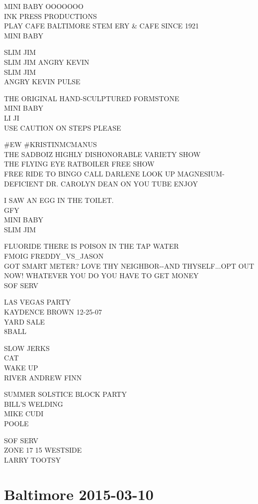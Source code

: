 \documentclass[10pt,letterpaper]{article}
\begin{document}
MINI BABY OOOOOOO\\
INK PRESS PRODUCTIONS\\
PLAY CAFE BALTIMORE STEM ERY \& CAFE SINCE 1921\\
MINI BABY

SLIM JIM\\
SLIM JIM ANGRY KEVIN\\
SLIM JIM\\
ANGRY KEVIN PULSE

THE ORIGINAL HAND{-}SCULPTURED FORMSTONE\\
MINI BABY\\
LI JI\\
USE CAUTION ON STEPS PLEASE

\#EW \#KRISTINMCMANUS\\
THE SADBOIZ HIGHLY DISHONORABLE VARIETY SHOW\\
THE FLYING EYE RATBOILER FREE SHOW\\
FREE RIDE TO BINGO CALL DARLENE LOOK UP MAGNESIUM{-}DEFICIENT DR. CAROLYN DEAN ON YOU TUBE ENJOY

I SAW AN EGG IN THE TOILET.\\
GFY\\
MINI BABY\\
SLIM JIM

FLUORIDE THERE IS POISON IN THE TAP WATER\\
FMOIG FREDDY\_VS\_JASON\\
GOT SMART METER? LOVE THY NEIGHBOR{-}{-}AND THYSELF...OPT OUT NOW!  WHATEVER YOU DO YOU HAVE TO GET MONEY\\
SOF SERV

LAS VEGAS PARTY\\
KAYDENCE BROWN 12{-}25{-}07\\
YARD SALE\\
8BALL

SLOW JERKS\\
CAT\\
WAKE UP\\
RIVER ANDREW FINN

SUMMER SOLSTICE BLOCK PARTY\\
BILL'S WELDING\\
MIKE CUDI\\
POOLE

SOF SERV\\
ZONE 17 15 WESTSIDE\\
LARRY TOOTSY


\section*{Baltimore 2015-03-10}
\end{document}
